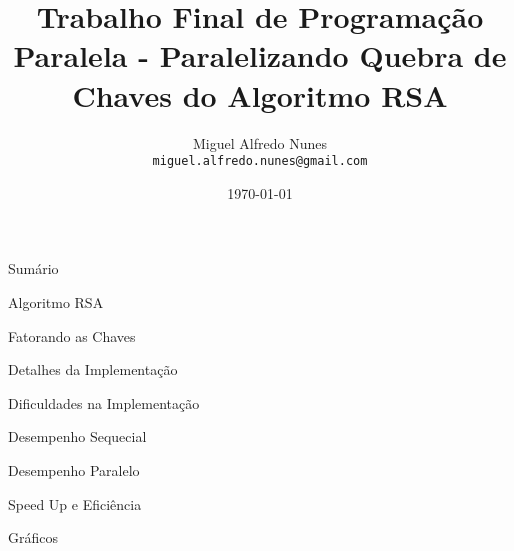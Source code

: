 \documentclass[xcolor=table]{beamer}
\title[]{Trabalho Final de Programação Paralela - Paralelizando Quebra de Chaves do Algoritmo RSA}
\author[Miguel Alfredo Nunes]{
    Miguel Alfredo Nunes\\\smallskip
    \texttt{miguel.alfredo.nunes@gmail.com}
}
\date{\today}
\begin{document}
    
    \begin{frame}
        \titlepage
    \end{frame}

    \begin{frame}[allowframebreaks]{Sumário}
        \tableofcontents
    \end{frame}

    \begin{frame}{Algoritmo RSA}

    \end{frame}
    
    \begin{frame}{Fatorando as Chaves}

    \end{frame}
    
    \begin{frame}{Detalhes da Implementação}
        
    \end{frame}

    \begin{frame}{Dificuldades na Implementação}

    \end{frame}

    \begin{frame}{Desempenho Sequecial}
   
    \end{frame}

    \begin{frame}{Desempenho Paralelo}
   
    \end{frame}

    \begin{frame}{Speed Up e Eficiência}
   
    \end{frame}

    \begin{frame}{Gráficos}

    \end{frame}

\end{document}

